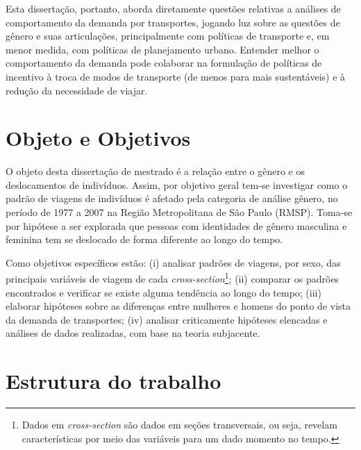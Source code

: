 Esta dissertação, portanto, aborda diretamente questões relativas a análises de comportamento da demanda por transportes, jogando luz sobre as questões de  gênero e suas articulações, principalmente com políticas de transporte e, em menor medida, com políticas de planejamento urbano. Entender melhor o comportamento da demanda pode colaborar na formulação de políticas de incentivo à troca de modos de transporte (de menos para mais sustentáveis) e à redução da necessidade de viajar.

\section{Objeto e Objetivos}
O objeto desta dissertação de mestrado é a relação entre o gênero e os deslocamentos de indivíduos. Assim, por objetivo geral tem-se investigar como o padrão de viagens de indivíduos é afetado pela categoria de análise gênero, no período de 1977 a 2007 na Região Metropolitana de São Paulo (RMSP). Toma-se por hipótese a ser explorada que pessoas com identidades de gênero masculina e feminina tem se deslocado de forma diferente ao longo do tempo.

Como objetivos específicos estão:
(i) analisar padrões de viagens, por sexo, das principais variáveis de viagem de cada \emph{cross-section}\footnote{Dados em \emph{cross-section} são dados em seções transversais, ou seja, revelam características por meio das variáveis para um dado momento no tempo.};
(ii) comparar os padrões encontrados e verificar se existe alguma tendência ao longo do tempo;
(iii) elaborar hipóteses sobre as diferenças entre mulheres e homens do ponto de vista da demanda de transportes;
(iv) analisar criticamente hipóteses elencadas e análises de dados realizadas, com base na teoria subjacente.


\section{Estrutura do trabalho}

